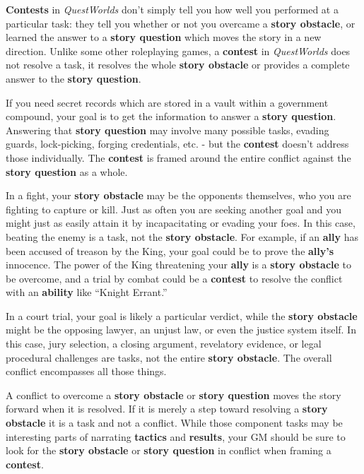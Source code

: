 \documentclass[
  11pt,
]{article}
\begin{document}
\textbf{Contests} in \emph{QuestWorlds} don't simply tell you how well
you performed at a particular task: they tell you whether or not you
overcame a \textbf{story obstacle}, or learned the answer to a
\textbf{story question} which moves the story in a new direction. Unlike
some other roleplaying games, a \textbf{contest} in \emph{QuestWorlds}
does not resolve a task, it resolves the whole \textbf{story obstacle}
or provides a complete answer to the \textbf{story question}.

If you need secret records which are stored in a vault within a
government compound, your goal is to get the information to answer a
\textbf{story question}. Answering that \textbf{story question} may
involve many possible tasks, evading guards, lock-picking, forging
credentials, etc. - but the \textbf{contest} doesn't address those
individually. The \textbf{contest} is framed around the entire conflict
against the \textbf{story question} as a whole.

In a fight, your \textbf{story obstacle} may be the opponents
themselves, who you are fighting to capture or kill. Just as often you
are seeking another goal and you might just as easily attain it by
incapacitating or evading your foes. In this case, beating the enemy is
a task, not the \textbf{story obstacle}. For example, if an
\textbf{ally} has been accused of treason by the King, your goal could
be to prove the \textbf{ally's} innocence. The power of the King
threatening your \textbf{ally} is a \textbf{story obstacle} to be
overcome, and a trial by combat could be a \textbf{contest} to resolve
the conflict with an \textbf{ability} like ``Knight Errant.''

In a court trial, your goal is likely a particular verdict, while the
\textbf{story obstacle} might be the opposing lawyer, an unjust law, or
even the justice system itself. In this case, jury selection, a closing
argument, revelatory evidence, or legal procedural challenges are tasks,
not the entire \textbf{story obstacle}. The overall conflict encompasses
all those things.

A conflict to overcome a \textbf{story obstacle} or \textbf{story
question} moves the story forward when it is resolved. If it is merely a
step toward resolving a \textbf{story obstacle} it is a task and not a
conflict. While those component tasks may be interesting parts of
narrating \textbf{tactics} and \textbf{results}, your GM should be sure
to look for the \textbf{story obstacle} or \textbf{story question} in
conflict when framing a \textbf{contest}.
\end{document}
